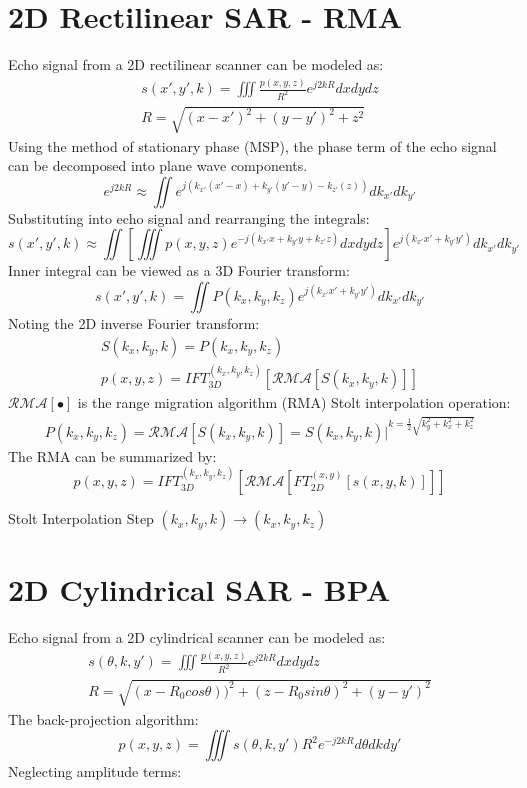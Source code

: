 \documentclass{article}
\begin{document}
\section{2D Rectilinear SAR - RMA}
Echo signal from a 2D rectilinear scanner can be modeled as:
\begin{gather}
s(x',y',k) = \iiint \frac{p(x,y,z)}{R^2}e^{j2kR}dxdydz \\
R = \sqrt{(x - x')^2 + (y - y')^2 + z^2}
\end{gather}
Using the method of stationary phase (MSP), the phase term of the echo signal can be decomposed into plane wave components.
\begin{equation}
e^{j2kR} \approx \iint e^{j(k_{x'}(x'-x) + k_{y'}(y'-y) - k_{z'}(z) )} dk_{x'}dk_{y'}
\end{equation}
Substituting into echo signal and rearranging the integrals:
\begin{equation}
s(x',y',k) \approx \iint \left[ \iiint p(x,y,z) e^{-j(k_{x'}x + k_{y'}y + k_{z'}z)} dxdydz \right] 
e^{j(k_{x'}x' + k_{y'}y')} dk_{x'}dk_{y'}
\end{equation}
Inner integral can be viewed as a 3D Fourier transform:
\begin{equation}
s(x',y',k) = \iint P(k_{x},k_{y},k_{z}) e^{j(k_{x'}x' + k_{y'}y')} dk_{x'}dk_{y'}
\end{equation}
Noting the 2D inverse Fourier transform:
\begin{gather}
	S(k_x,k_y,k) = P(k_x,k_y,k_z) \\
	p(x,y,z) = IFT_{3D}^{(k_x,k_y,k_z)}[\mathcal{RMA}[S(k_x,k_y,k)]]
\end{gather}
$\mathcal{RMA}[\bullet]$ is the range migration algorithm (RMA) Stolt interpolation operation:
\begin{gather}
	P(k_x,k_y,k_z) = \mathcal{RMA}[S(k_x,k_y,k)] = S(k_x,k_y,k)\biggr\rvert^{k =\frac{1}{2} \sqrt{k_y^2 + k_x^2 + k_z^2}}
\end{gather}
The RMA can be summarized by:
\begin{equation}
	p(x,y,z) = IFT_{3D}^{(k_x,k_y,k_z)}\left[\mathcal{RMA}\left[FT_{2D}^{(x,y)}[s(x,y,k)]\right]\right]
\end{equation}

Stolt Interpolation Step
$(k_x,k_y,k) \rightarrow (k_x,k_y,k_z)$

\section{2D Cylindrical SAR - BPA}
Echo signal from a 2D cylindrical scanner can be modeled as:
\begin{gather}
s(\theta,k,y') = \iiint \frac{p(x,y,z)}{R^2}e^{j2kR}dxdydz \\
R = \sqrt{(x - R_0cos\theta))^2 + (z - R_0sin\theta)^2 + (y - y')^2}
\end{gather}
The back-projection algorithm:
\begin{equation}
p(x,y,z) = \iiint s(\theta,k,y') R^2 e^{-j2kR} d\theta dk dy'
\end{equation}
Neglecting amplitude terms:
\end{document}
